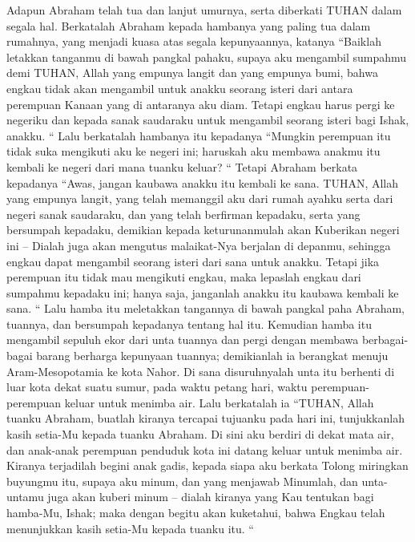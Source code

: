 \begin{biblechapter} %
 Adapun Abraham telah tua dan lanjut umurnya, serta diberkati TUHAN dalam segala hal.
\verse Berkatalah Abraham kepada hambanya yang paling tua dalam rumahnya, yang menjadi kuasa atas segala kepunyaannya, katanya “Baiklah letakkan tanganmu di bawah pangkal pahaku,
\verse supaya aku mengambil sumpahmu demi TUHAN, Allah yang empunya langit dan yang empunya bumi, bahwa engkau tidak akan mengambil untuk anakku seorang isteri dari antara perempuan Kanaan yang di antaranya aku diam.
\verse Tetapi engkau harus pergi ke negeriku dan kepada sanak saudaraku untuk mengambil seorang isteri bagi Ishak, anakku. “
\verse Lalu berkatalah hambanya itu kepadanya “Mungkin perempuan itu tidak suka mengikuti aku ke negeri ini; haruskah aku membawa anakmu itu kembali ke negeri dari mana tuanku keluar? “
\verse Tetapi Abraham berkata kepadanya “Awas, jangan kaubawa anakku itu kembali ke sana.
\verse TUHAN, Allah yang empunya langit, yang telah memanggil aku dari rumah ayahku serta dari negeri sanak saudaraku, dan yang telah berfirman kepadaku, serta yang bersumpah kepadaku, demikian kepada keturunanmulah akan Kuberikan negeri ini -- Dialah juga akan mengutus malaikat-Nya berjalan di depanmu, sehingga engkau dapat mengambil seorang isteri dari sana untuk anakku.
\verse Tetapi jika perempuan itu tidak mau mengikuti engkau, maka lepaslah engkau dari sumpahmu kepadaku ini; hanya saja, janganlah anakku itu kaubawa kembali ke sana. “
\verse Lalu hamba itu meletakkan tangannya di bawah pangkal paha Abraham, tuannya, dan bersumpah kepadanya tentang hal itu.
\verse Kemudian hamba itu mengambil sepuluh ekor dari unta tuannya dan pergi dengan membawa berbagai-bagai barang berharga kepunyaan tuannya; demikianlah ia berangkat menuju Aram-Mesopotamia ke kota Nahor.
\verse Di sana disuruhnyalah unta itu berhenti di luar kota dekat suatu sumur, pada waktu petang hari, waktu perempuan-perempuan keluar untuk menimba air.
\verse Lalu berkatalah ia “TUHAN, Allah tuanku Abraham, buatlah kiranya tercapai tujuanku pada hari ini, tunjukkanlah kasih setia-Mu kepada tuanku Abraham.
\verse Di sini aku berdiri di dekat mata air, dan anak-anak perempuan penduduk kota ini datang keluar untuk menimba air.
\verse Kiranya terjadilah begini anak gadis, kepada siapa aku berkata Tolong miringkan buyungmu itu, supaya aku minum, dan yang menjawab Minumlah, dan unta-untamu juga akan kuberi minum -- dialah kiranya yang Kau tentukan bagi hamba-Mu, Ishak; maka dengan begitu akan kuketahui, bahwa Engkau telah menunjukkan kasih setia-Mu kepada tuanku itu. “

\end{biblechapter}
